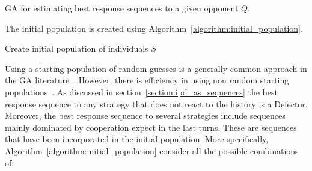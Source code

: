 \begin{algorithm}[!htbp]
    \SetAlgoLined
     \caption{GA for estimating best response sequences to a given opponent \(Q\).}\label{algorithm:genetic_algorithm}
\end{algorithm}

The initial population is created using Algorithm~\ref{algorithm:initial_population}.

\begin{algorithm}[!htbp]
    \SetAlgoLined

 \caption{Create initial population of individuals \(S\)}\label{algorithm:initial_population}
\end{algorithm}

Using a starting population of random guesses is a generally common approach in
the GA literature~\cite{Hou1994}. However, there is efficiency in using non
random starting populations~\cite{Drezner2005, Osaba2014}.
As discussed in section~\ref{section:ipd_as_sequences} the best response sequence
to any strategy that does not react to the history is a Defector. Moreover,
the best response sequence to several strategies include sequences mainly dominated
by cooperation expect in the last turns. These are
sequences that have been incorporated in the initial population. More specifically,
Algorithm~\ref{algorithm:initial_population} consider all the possible combinations
of:

